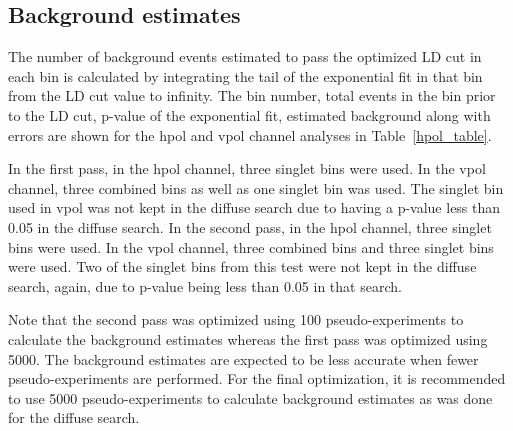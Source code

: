 \subsection{Background estimates}

The number of background events estimated to pass the optimized LD cut in each bin is calculated by integrating the tail of the exponential fit in that bin from the LD cut value to infinity. The bin number, total events in the bin prior to the LD cut, p-value of the exponential fit, estimated background along with errors are shown for the \gls{hpol} and \gls{vpol} channel analyses in Table~\ref{hpol_table}. 

In the first pass, in the \gls{hpol} channel, three singlet bins were used. In the \gls{vpol} channel, three combined bins as well as one singlet bin was used. The singlet bin used in \gls{vpol} was not kept in the diffuse search due to having a p-value less than 0.05 in the diffuse search. In the second pass, in the \gls{hpol} channel, three singlet bins were used. In the \gls{vpol} channel, three combined bins and three singlet bins were used. Two of the singlet bins from this test were not kept in the diffuse search, again, due to p-value being less than 0.05 in that search. 

Note that the second pass was optimized using 100 pseudo-experiments to calculate the background estimates whereas the first pass was optimized using 5000. The background estimates are expected to be less accurate when fewer pseudo-experiments are performed. For the final optimization, it is recommended to use 5000 pseudo-experiments to calculate background estimates as was done for the diffuse search. 


